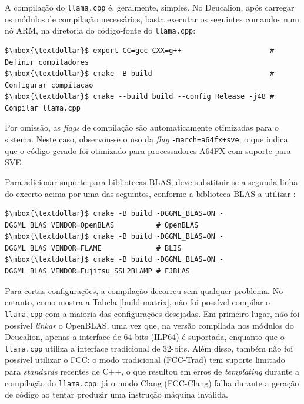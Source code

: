 \documentclass[11pt, a4paper]{article}
\begin{document}
A compilação do \texttt{llama.cpp} é, geralmente, simples. No Deucalion, após carregar os módulos de
compilação necessários, basta executar os seguintes comandos num nó ARM, na diretoria do
código-fonte do \texttt{llama.cpp}:

\vspace{\baselineskip}
\begin{lstlisting}[mathescape]
$\mbox{\textdollar}$ export CC=gcc CXX=g++                     # Definir compiladores
$\mbox{\textdollar}$ cmake -B build                            # Configurar compilacao
$\mbox{\textdollar}$ cmake --build build --config Release -j48 # Compilar llama.cpp
\end{lstlisting}

Por omissão, as \emph{flags} de compilação são automaticamente otimizadas para o sistema. Neste
caso, observou-se o uso da \emph{flag} \texttt{-march=a64fx+sve}, o que indica que o código gerado
foi otimizado para processadores A64FX com suporte para SVE.

Para adicionar suporte para bibliotecas BLAS, deve substituir-se a segunda linha do excerto acima
por uma das seguintes, conforme a biblioteca BLAS a utilizar \cite{llama-build, cmake-blas}:

\vspace{\baselineskip}
\begin{lstlisting}[mathescape]
$\mbox{\textdollar}$ cmake -B build -DGGML_BLAS=ON -DGGML_BLAS_VENDOR=OpenBLAS          # OpenBLAS
$\mbox{\textdollar}$ cmake -B build -DGGML_BLAS=ON -DGGML_BLAS_VENDOR=FLAME             # BLIS
$\mbox{\textdollar}$ cmake -B build -DGGML_BLAS=ON -DGGML_BLAS_VENDOR=Fujitsu_SSL2BLAMP # FJBLAS
\end{lstlisting}

Para certas configurações, a compilação decorreu sem qualquer problema. No entanto, como mostra a
Tabela \ref{build-matrix}, não foi possível compilar o \texttt{llama.cpp} com a maioria das
configurações desejadas. Em primeiro lugar, não foi possível \emph{linkar} o OpenBLAS, uma vez que,
na versão compilada nos módulos do Deucalion, apenas a interface de 64-bits (ILP64) é suportada,
enquanto que o \texttt{llama.cpp} utiliza a interface tradicional de 32-bits. Além disso, também não
foi possível utilizar o FCC: o modo tradicional (FCC-Trad) tem suporte limitado para
\emph{standards} recentes de C++, o que resultou em erros de \emph{templating} durante a compilação
do \texttt{llama.cpp}; já o modo Clang (FCC-Clang) falha durante a geração de código ao tentar
produzir uma instrução máquina inválida.
\end{document}
